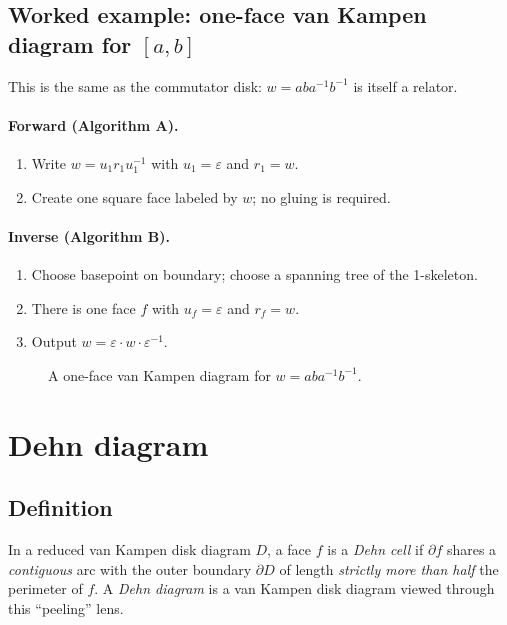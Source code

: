 \documentclass[11pt]{article}
\theoremstyle{definition}
\theoremstyle{plain}
\theoremstyle{remark}
\begin{document}
\subsection*{Worked example: one-face van Kampen diagram for $[a,b]$}
This is the same as the commutator disk: $w=aba^{-1}b^{-1}$ is itself a relator.

\paragraph{Forward (Algorithm A).}
\begin{enumerate}[leftmargin=2.2em]
\item Write $w=u_1 r_1 u_1^{-1}$ with $u_1=\varepsilon$ and $r_1=w$.
\item Create one square face labeled by $w$; no gluing is required.
\end{enumerate}

\paragraph{Inverse (Algorithm B).}
\begin{enumerate}[leftmargin=2.2em]
\item Choose basepoint on boundary; choose a spanning tree of the 1-skeleton.
\item There is one face $f$ with $u_f=\varepsilon$ and $r_f=w$.
\item Output $w=\varepsilon\cdot w\cdot \varepsilon^{-1}$.
\end{enumerate}

\begin{figure}[h]
\centering
{}
\caption{A one-face van Kampen diagram for $w=aba^{-1}b^{-1}$.}
\end{figure}
\clearpage
\section{Dehn diagram}

\subsection*{Definition}
In a reduced van Kampen disk diagram $D$, a face $f$ is a \emph{Dehn cell} if
$\partial f$ shares a \emph{contiguous} arc with the outer boundary $\partial D$ of length \emph{strictly more than half} the perimeter of $f$.
A \emph{Dehn diagram} is a van Kampen disk diagram viewed through this ``peeling'' lens.
\end{document}
